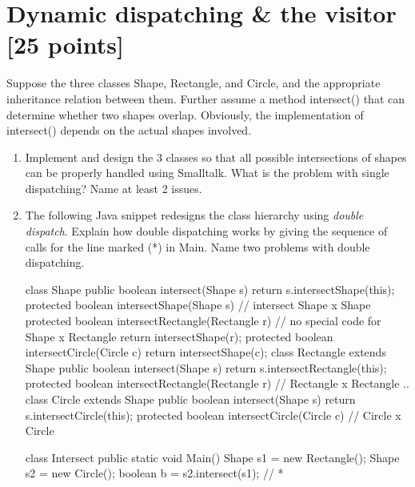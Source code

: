 \documentclass{article}
\begin{document}
\newpage
\section{Dynamic dispatching \& the visitor [25 points]}

Suppose the three classes \textsf{Shape}, \textsf{Rectangle}, and 
\textsf{Circle}, and the appropriate inheritance relation between them.
Further assume a method \textsf{intersect()} that can determine whether two
shapes overlap. Obviously, the implementation of \textsf{intersect()} 
depends on the actual shapes involved. 

\begin{enumerate}
\item Implement  and design  the 3 classes so that all possible
  intersections of shapes can be properly handled using Smalltalk.
  What is the problem with single dispatching? Name at least 2 issues.
\item The following Java snippet redesigns the
  class hierarchy using \textit{double dispatch}. 
  Explain how double dispatching works by
  giving the sequence of calls for the line marked (*) in \textsf{Main}.
  Name two problems with double dispatching.
  
\begin{java}
class Shape {
    public  boolean intersect(Shape s) {
         return s.intersectShape(this);
    }
    protected  boolean intersectShape(Shape s) {
        // intersect Shape x Shape
    }
    protected  boolean intersectRectangle(Rectangle r) {
        // no special code for Shape x Rectangle
        return intersectShape(r);
    }
    protected  boolean intersectCircle(Circle c) {
        return intersectShape(c);
   }
}
class Rectangle extends Shape {
    public  boolean intersect(Shape s) {
        return s.intersectRectangle(this);  
    }
    protected  boolean intersectRectangle(Rectangle r) {
        // Rectangle x Rectangle
        ..
    }
}
class Circle extends Shape {
    public  boolean intersect(Shape s) {
        return s.intersectCircle(this);  
    }
    protected  boolean intersectCircle(Circle c) {
        // Circle x Circle 
   }   
}

class Intersect {
   public static void Main() {
      Shape s1 = new Rectangle(); 
      Shape s2 = new Circle();
      boolean b = s2.intersect(s1);        // *
   }
}
\end{java}


\end{enumerate}
\end{document}

